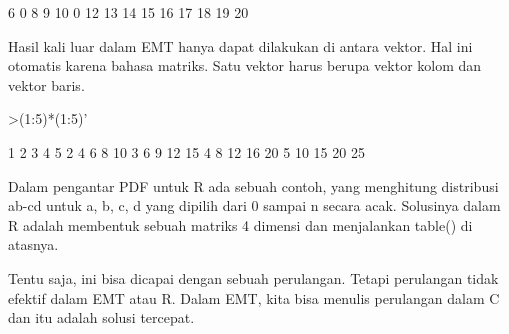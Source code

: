 \documentclass[a4paper,10pt]{article}
\begin{document}
\begin{eulernotebook}
\begin{eulercomment}
\begin{eulercomment}
\begin{eulercomment}
\begin{eulercomment}
\begin{eulercomment}
\begin{eulercomment}
\begin{eulercomment}
\begin{eulercomment}
\begin{eulercomment}
\begin{eulercomment}
\begin{eulercomment}
\begin{eulercomment}
\begin{eulercomment}
\begin{eulercomment}
\begin{eulercomment}
\begin{eulercomment}
\begin{eulercomment}
\begin{eulercomment}
\begin{eulercomment}
\begin{eulercomment}
\begin{eulercomment}
\begin{eulercomment}
\begin{euleroutput}
          6         0         8         9        10 
          0        12        13        14        15 
         16        17        18        19        20 
\end{euleroutput}
\begin{eulercomment}
Hasil kali luar dalam EMT hanya dapat dilakukan di antara vektor. Hal
ini otomatis karena bahasa matriks. Satu vektor harus berupa vektor
kolom dan vektor baris.
\end{eulercomment}
\begin{eulerprompt}
>(1:5)*(1:5)'
\end{eulerprompt}
\begin{euleroutput}
          1         2         3         4         5 
          2         4         6         8        10 
          3         6         9        12        15 
          4         8        12        16        20 
          5        10        15        20        25 
\end{euleroutput}
\begin{eulercomment}
Dalam pengantar PDF untuk R ada sebuah contoh, yang menghitung
distribusi ab-cd untuk a, b, c, d yang dipilih dari 0 sampai n secara
acak. Solusinya dalam R adalah membentuk sebuah matriks 4 dimensi dan
menjalankan table() di atasnya.

Tentu saja, ini bisa dicapai dengan sebuah perulangan. Tetapi
perulangan tidak efektif dalam EMT atau R. Dalam EMT, kita bisa
menulis perulangan dalam C dan itu adalah solusi tercepat.


\end{eulercomment}
\end{eulercomment}
\end{eulercomment}
\end{eulercomment}
\end{eulercomment}
\end{eulercomment}
\end{eulercomment}
\end{eulercomment}
\end{eulercomment}
\end{eulercomment}
\end{eulercomment}
\end{eulercomment}
\end{eulercomment}
\end{eulercomment}
\end{eulercomment}
\end{eulercomment}
\end{eulercomment}
\end{eulercomment}
\end{eulercomment}
\end{eulercomment}
\end{eulercomment}
\end{eulercomment}
\end{eulercomment}
\end{eulernotebook}
\end{document}
